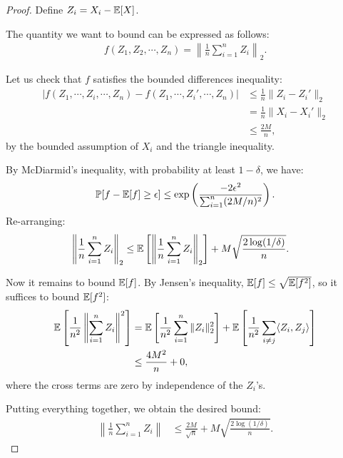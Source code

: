 \documentclass[tablecaption=bottom]{jmlr}
\begin{document}
\begin{proof}
  Define $Z_i = X_i - \operatorname{\mathbb{E}}[X]$.


The quantity we want to bound can be expressed as follows:
  \begin{align}
  f(Z_1, Z_2, \cdots, Z_n) = \left\| \frac1n \sum_{i=1}^n Z_i \right\|_2.
  \end{align}

Let us check that $f$ satisfies the bounded differences inequality:
  \begin{align}
|f(Z_1, \cdots, Z_i, \cdots, Z_n) - f(Z_1, \cdots, Z_i', \cdots, Z_n)|
& \le \frac1n \|Z_i - Z_i'\|_2 \\
& = \frac1n \|X_i - X_i'\|_2 \\
&\le \frac{2M}{n},
  \end{align}
  by the bounded assumption of $X_i$ and the triangle inequality.

By McDiarmid's inequality,
with probability at least $1 - \delta$,
we have:
\begin{align}
\mathbb{P}[f - \operatorname{\mathbb{E}}[f] \ge \epsilon] \le
\exp\left(\frac{-2 \epsilon^2}{\sum_{i=1}^n (2M/n)^2}\right).
\end{align}
Re-arranging:
\begin{align}
  \left\|\frac{1}{n}\sum_{i=1}^n Z_i\right\|_2
  &\le \operatorname{\mathbb{E}}\left[ \left\| \frac{1}{n} \sum_{i=1}^n Z_i \right\|_2 \right]
  + M\sqrt{\frac{2\log(1/\delta)}{n}}.
\end{align}

Now it remains to bound $\operatorname{\mathbb{E}}[f]$.
By Jensen's inequality, $\operatorname{\mathbb{E}}[f] \le \sqrt{\operatorname{\mathbb{E}}[f^2]}$,
so it suffices to bound $\operatorname{\mathbb{E}}[f^2]$:
\begin{align}
  \operatorname{\mathbb{E}}\left[ \frac1{n^2} \left\| \sum_{i=1}^n Z_i \right\|^2 \right]
  &= \operatorname{\mathbb{E}}\left[ \frac1{n^2} \sum_{i=1}^n \|Z_i\|_2^2 \right] +
\operatorname{\mathbb{E}}\left[ \frac1{n^2} \sum_{i\neq j} \langle Z_i, Z_j \rangle \right] \\ 
& \le \frac{4M^2}{n} + 0,
\end{align}
where the cross terms are zero by independence of the $Z_i$'s.

Putting everything together, we obtain the desired bound:
\begin{align}
\left\|\frac{1}{n}\sum_{i=1}^n Z_i \right\|
&\le \frac{2M}{\sqrt{n}} + M \sqrt{\frac{2\log(1/\delta)}{n}}.
\end{align}
\end{proof}
\end{document}
